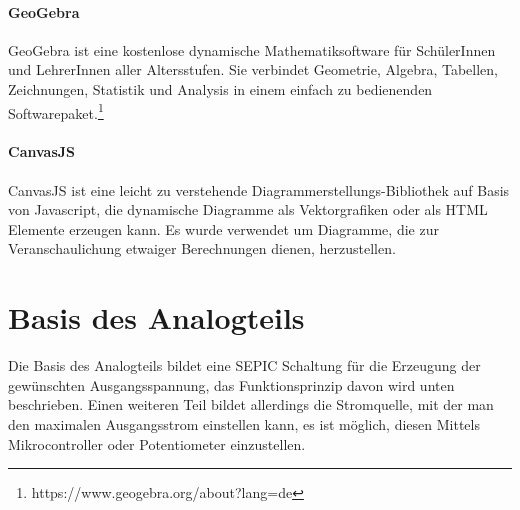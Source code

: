 \documentclass[paper=a4, 12pt]{scrreprt}
\begin{document}
	\paragraph{GeoGebra}\hfill \break
	GeoGebra ist eine kostenlose dynamische Mathematiksoftware für SchülerInnen und LehrerInnen aller Altersstufen. Sie verbindet Geometrie, Algebra, Tabellen, Zeichnungen, Statistik und Analysis in einem einfach zu bedienenden Softwarepaket.\footnote{https://www.geogebra.org/about?lang=de}
	\paragraph{CanvasJS}\hfill \break
	CanvasJS ist eine leicht zu verstehende Diagrammerstellungs-Bibliothek auf Basis von Javascript, die dynamische Diagramme als Vektorgrafiken oder als HTML Elemente erzeugen kann. Es wurde verwendet um Diagramme, die zur Veranschaulichung etwaiger Berechnungen dienen, herzustellen.
	\newpage
	
	\section{Basis des Analogteils}\hfill \break
	Die Basis des Analogteils bildet eine SEPIC Schaltung für die Erzeugung der gewünschten Ausgangsspannung, das Funktionsprinzip davon wird unten beschrieben. Einen weiteren Teil bildet allerdings die Stromquelle, mit der man den maximalen Ausgangsstrom einstellen kann, es ist möglich, diesen Mittels Mikrocontroller oder Potentiometer einzustellen.
\end{document}
